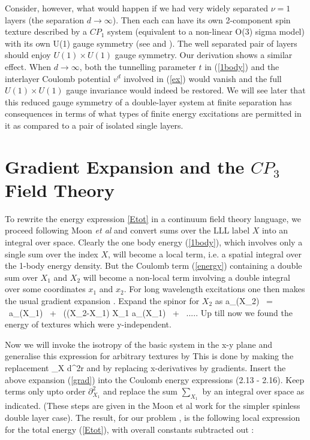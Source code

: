  Consider,  however, what would happen if we had
 very  widely separated $\nu = 1$ layers 
 (the separation $d \rightarrow \infty$).
Then each can have its own 2-component spin texture 
 described by a $CP_1$ system
 (equivalent to a non-linear O(3) sigma model) with its own U(1)
  gauge symmetry (see \cite{GirvMac} and \cite {Raj}). 
  The well separated pair of layers should enjoy  $U(1) \times U(1)$
gauge  symmetry. Our derivation shows a similar effect. When
  $d \rightarrow \infty$,
  both the tunnelling parameter $t$ in (\ref{1body}) and the interlayer
 Coulomb potential $v^{d}$ involved in (\ref{ex})
 would vanish and the full  $U(1) \times U(1)$ gauge invariance would 
 indeed be restored. 
   We will see later that this reduced gauge symmetry of a double-layer system
at finite separation  has consequences in terms of what types of finite
  energy excitations are permitted in it  as compared
  to a pair of isolated single layers.

\section{Gradient Expansion and the $CP_3$ Field Theory}

To rewrite the energy expression \ref{Etot} in a continuum field theory 
language, we proceed following Moon {\sl et al} \cite{Moon} and convert 
sums over the LLL label $X$ into an integral over  space. 
Clearly the one body energy (\ref{1body}), which involves only a single sum
over the index $X$,  will become a  local term, i.e. a spatial integral over 
the 1-body energy density. But the Coulomb term (\ref{energy}) containing
 a double sum over
$X_{1}$ and $X_{2}$ will become a non-local term involving a double integral
over some coordinates $x_{1}$ and  $x_{2}$. For long wavelength
excitations one then makes the usual gradient expansion . Expand the spinor 
for $X_2$ as 
\beq a_{\sigma}(X_{2}) \ = \  a_{\sigma}(X_{1}) \ + \ ((X_{2}-X_{1})
{\partial \over \partial X_{1}} a_{\sigma}(X_{1}) \ + \ ..\label{grad}... \eeq
Up till now we found the energy of textures which were y-independent.

Now we will invoke the isotropy of the basic system in the x-y plane
and generalise this expression for arbitrary textures by 
This is done by  
making the replacement
\beq \sum_{X}  \int d^{2}r \eeq
and by replacing x-derivatives by gradients.
 Insert the above expansion (\ref{grad}) into the Coulomb energy
 expressions (2.13 - 2.16). 
 Keep  terms only upto order $\partial_{X_{1}}^2$  and replace the sum 
$\sum_{X_{1}}$ by an integral over space as indicated. (These 
steps are given in the Moon et al work \cite{Moon} for  the simpler
spinless double layer case). The result, for our problem , is the following
local expression for the total energy (\ref{Etot}), with overall constants 
subtracted out :
    
